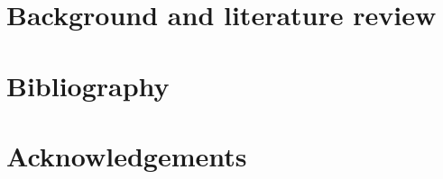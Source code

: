 \documentclass[a4paper,11pt,oneside]{article}
\begin{document}
\newpage
\section{Background and literature review}












\newpage
\section*{Bibliography}
\printbibliography


\newpage
\section*{Acknowledgements}
\end{document}
